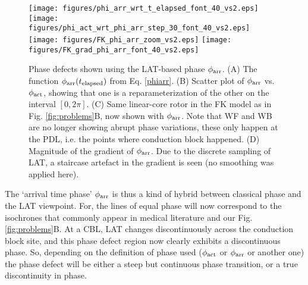\documentclass{article}
\newcommand{\phiact}{\ensuremath{\phi_{\rm act}}}
\newcommand{\phiarr}{\ensuremath{\phi_{\rm arr}}}
\newcommand{\tlap}{\ensuremath{t_{\rm elapsed}}}
\begin{document}
\begin{figure}
    \centering
{}    \texttt{[image: figures/phi\_arr\_wrt\_t\_elapsed\_font\_40\_vs2.eps]}
    \texttt{[image: figures/phi\_act\_wrt\_phi\_arr\_step\_30\_font\_40\_vs2.eps]} \\
    \texttt{[image: figures/FK\_phi\_arr\_zoom\_vs2.eps]}
    \texttt{[image: figures/FK\_grad\_phi\_arr\_font\_40\_vs2.eps]}
     \caption{Phase defects shown using the LAT-based phase $\phiarr$. (A) The function $\phiarr(\tlap)$ from Eq. \eqref{phiarr}. (B) Scatter plot of $\phiarr$ vs. $\phiact$, showing that one is a reparameterization of the other on the interval $[0, 2\pi]$. (C) Same linear-core rotor in the FK model as in Fig. \ref{fig:problems}B, now shown with $\phiarr$. Note that WF and WB are no longer showing abrupt phase variations, these only happen at the PDL, i.e. the points where conduction block happened. (D) Magnitude of the gradient of $\phiarr$. Due to the discrete sampling of LAT, a staircase artefact in the gradient is seen (no smoothing was applied here). 
    }
    \label{fig:phiarr}
\end{figure}

The `arrival time phase' $\phiarr$ is thus a kind of hybrid between classical phase and the LAT viewpoint. For, the lines of equal phase will now correspond to the isochrones that commonly appear in medical literature and our Fig. \ref{fig:problems}B. At a CBL, LAT changes discontinuously across the conduction block site, and this phase defect region now clearly exhibits a discontinuous phase. So, depending on the definition of phase used ($\phiact$ or $\phiarr$ or another one) the phase defect will be either a steep but continuous phase transition, or a true discontinuity in phase. 
\end{document}
